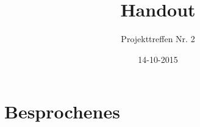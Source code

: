 \documentclass[a4paper,DIV=9,12pt]{scrreprt}
\begin{document}


\onehalfspace

\begin{titlepage}
    \title{Handout}
    \subtitle{Projekttreffen Nr. 2}
    \author{}
    \date{14-10-2015}
    \maketitle
    \thispagestyle{empty}
\end{titlepage}
\setcounter{page}{1}


\chapter{Besprochenes}
\end{document}
